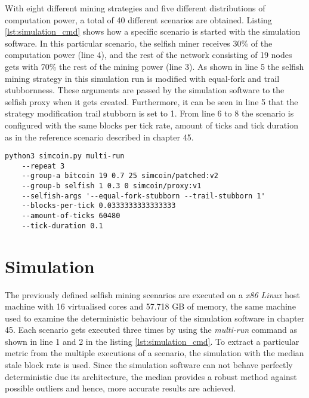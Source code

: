 With eight different mining strategies and five different distributions of computation power, a total of 40 different scenarios are obtained.
Listing \ref{lst:simulation_cmd} shows how a specific scenario is started with the simulation software.
In this particular scenario, the selfish miner receives 30\% of the computation power (line 4), and the rest of the network consisting of 19 nodes gets with 70\% the rest of the mining power (line 3).
As shown in line 5 the selfish mining strategy in this simulation run is modified with equal-fork and trail stubbornness.
These arguments are passed by the simulation software to the selfish proxy when it gets created.
Furthermore, it can be seen in line 5 that the strategy modification trail stubborn is set to 1.
From line 6 to 8 the scenario is configured with the same blocks per tick rate, amount of ticks and tick duration as in the reference scenario described in chapter 45.

\begin{minipage}{\linewidth}
\begin{lstlisting}[caption=Command to execute a particular selfish mining scenario, label={lst:simulation_cmd}, basicstyle=\ttfamily, captionpos=b]
python3 simcoin.py multi-run 
	--repeat 3 
	--group-a bitcoin 19 0.7 25 simcoin/patched:v2 
	--group-b selfish 1 0.3 0 simcoin/proxy:v1 
	--selfish-args '--equal-fork-stubborn --trail-stubborn 1' 
	--blocks-per-tick 0.0333333333333333 
	--amount-of-ticks 60480 
	--tick-duration 0.1
\end{lstlisting}
\end{minipage}

\section{Simulation}

The previously defined selfish mining scenarios are executed on a \textit{x86 Linux} host machine with 16 virtualised cores and 57.718 GB of memory, the same machine used to examine the deterministic behaviour of the simulation software in chapter 45.
Each scenario gets executed three times by using the \textit{multi-run} command as shown in line 1 and 2 in the listing \ref{lst:simulation_cmd}.
To extract a particular metric from the multiple executions of a scenario, the simulation with the median stale block rate is used.
Since the simulation software can not behave perfectly deterministic due its architecture, the median provides a robust method against possible outliers and hence, more accurate results are achieved.

